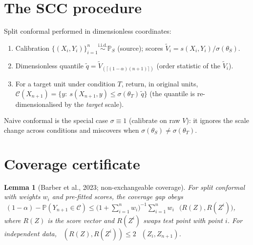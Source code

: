 \documentclass[11pt]{article}
\newtheorem{lemma}{Lemma}
\theoremstyle{definition}
\theoremstyle{remark}
\DeclareMathOperator{\dtv}{d_{\mathrm{TV}}}
\begin{document}
\section{The SCC procedure}
Split conformal performed in dimensionless coordinates:
\begin{enumerate}\itemsep2pt
\item Calibration $\{(X_i,Y_i)\}_{i=1}^n\stackrel{\text{i.i.d.}}{\sim}\mathbb P_S$
(source); scores $\tilde V_i=s(X_i,Y_i)/\sigma(\theta_S)$.
\item Dimensionless quantile $\tilde q=\tilde V_{(\lceil(1-\alpha)(n+1)\rceil)}$
(order statistic of the $\tilde V_i$).
\item For a target unit under condition $T$, return, in original units,
$\mathcal C(X_{n+1})=\{y:\ s(X_{n+1},y)\le \sigma(\theta_T)\,\tilde q\}$
(the quantile is re-dimensionalised by the \emph{target} scale).
\end{enumerate}
Naive conformal is the special case $\sigma\equiv1$ (calibrate on raw $V$): it ignores
the scale change across conditions and miscovers when $\sigma(\theta_S)\neq\sigma(\theta_T)$.

\section{Coverage certificate}
\begin{lemma}[Barber et al., 2023; non-exchangeable coverage]\label{lem:barber}
For split conformal with weights $w_i$ and pre-fitted scores, the coverage gap obeys
$\;(1-\alpha)-\mathbb P(Y_{n+1}\in\mathcal C)\le
\big(1+\textstyle\sum_{i=1}^n w_i\big)^{-1}\sum_{i=1}^n w_i\,\dtv\!\big(R(Z),R(Z^i)\big)$,
where $R(Z)$ is the score vector and $R(Z^i)$ swaps test point with point $i$. For
independent data, $\dtv(R(Z),R(Z^i))\le 2\,\dtv(Z_i,Z_{n+1})$.
\end{lemma}
\end{document}
